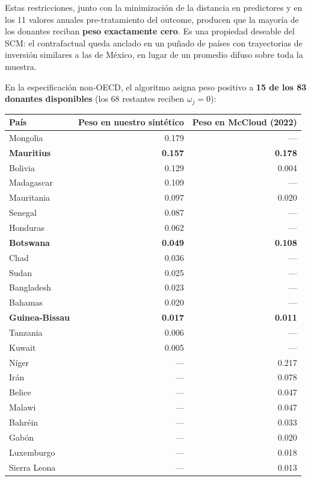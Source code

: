 \documentclass[11pt,a4paper]{article}
\begin{document}
Estas restricciones, junto con la minimización de la distancia en predictores y en los 11 valores anuales pre-tratamiento del outcome, producen que la mayoría de los donantes reciban \textbf{peso exactamente cero}. Es una propiedad deseable del SCM: el contrafactual queda anclado en un puñado de países con trayectorias de inversión similares a las de México, en lugar de un promedio difuso sobre toda la muestra.

En la especificación non-OECD, el algoritmo asigna peso positivo a \textbf{15 de los 83 donantes disponibles} (los 68 restantes reciben $\omega_j = 0$):

\vspace{4pt}
\begin{center}
\footnotesize
\begin{tabular}{@{} l r r @{}}
\toprule
\textbf{País} & \textbf{Peso en nuestro sintético} & \textbf{Peso en McCloud (2022)} \\
\midrule
Mongolia         & 0.179 & --- \\
\textbf{Mauritius}        & \textbf{0.157} & \textbf{0.178} \\
Bolivia          & 0.129 & 0.004 \\
Madagascar       & 0.109 & --- \\
Mauritania       & 0.097 & 0.020 \\
Senegal          & 0.087 & --- \\
Honduras         & 0.062 & --- \\
\textbf{Botswana}         & \textbf{0.049} & \textbf{0.108} \\
Chad             & 0.036 & --- \\
Sudan            & 0.025 & --- \\
Bangladesh       & 0.023 & --- \\
Bahamas          & 0.020 & --- \\
\textbf{Guinea-Bissau}    & \textbf{0.017} & \textbf{0.011} \\
Tanzania         & 0.006 & --- \\
Kuwait           & 0.005 & --- \\
\midrule
Níger            & ---   & 0.217 \\
Irán             & ---   & 0.078 \\
Belice           & ---   & 0.047 \\
Malawi           & ---   & 0.047 \\
Bahréin          & ---   & 0.033 \\
Gabón            & ---   & 0.020 \\
Luxemburgo       & ---   & 0.018 \\
Sierra Leona     & ---   & 0.013 \\
\bottomrule
\end{tabular}
\end{center}
\vspace{4pt}
\end{document}
